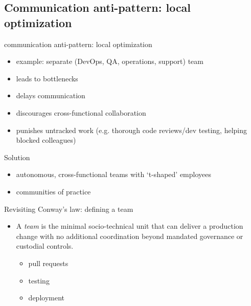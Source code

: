 \documentclass{beamer}
\begin{document}
	\subsection{Communication anti-pattern: local optimization}
	\begin{frame}{communication anti-pattern: local optimization}
		\begin{itemize}
			\item example: separate (DevOps, QA, operations, support) team \pause
			\item leads to bottlenecks \pause
			\item delays communication \pause
			\item discourages cross-functional collaboration \pause
			\item punishes untracked work (e.g. thorough code reviews/dev testing, helping blocked colleagues)
		\end{itemize}
	\end{frame}
	\begin{frame}{Solution}
		\begin{itemize}
			\item autonomous, cross-functional teams with `t-shaped' employees \pause
			\item communities of practice \pause
		\end{itemize}
	\end{frame}
	\begin{frame}{Revisiting Conway's law: defining a team}
		\begin{itemize}
			\item A \textit{team} is the minimal socio-technical unit that can deliver a production change with no additional coordination beyond mandated governance or custodial controls. \pause
			\begin{itemize}
				\item pull requests \pause
				\item testing \pause
				\item deployment \pause
			\end{itemize}
		\end{itemize}
	\end{frame}
\end{document}
